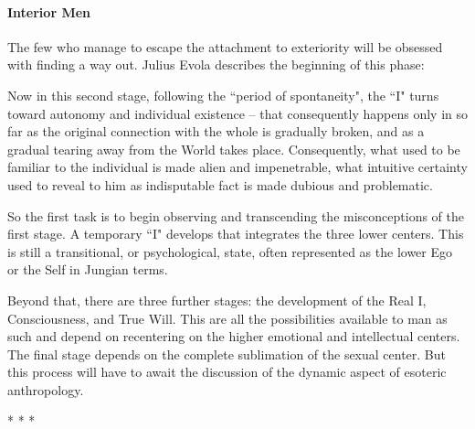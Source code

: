 \paragraph{Interior Men}
The few who manage to escape the attachment to exteriority will be obsessed with finding a way out. Julius Evola describes the beginning of this phase:

\begin{quotex}
Now in this second stage, following the ``period of spontaneity", the ``I" turns toward autonomy and individual existence – that consequently happens only in so far as the original connection with the whole is gradually broken, and as a gradual tearing away from the World takes place. Consequently, what used to be familiar to the individual is made alien and impenetrable, what intuitive certainty used to reveal to him as indisputable fact is made dubious and problematic. 

\end{quotex}
So the first task is to begin observing and transcending the misconceptions of the first stage. A temporary ``I" develops that integrates the three lower centers. This is still a transitional, or psychological, state, often represented as the lower Ego or the Self in Jungian terms.

Beyond that, there are three further stages: the development of the Real I, Consciousness, and True Will. This are all the possibilities available to man as such and depend on recentering on the higher emotional and intellectual centers. The final stage depends on the complete sublimation of the sexual center. But this process will have to await the discussion of the dynamic aspect of esoteric anthropology.




\begin{center}* * *\end{center}

